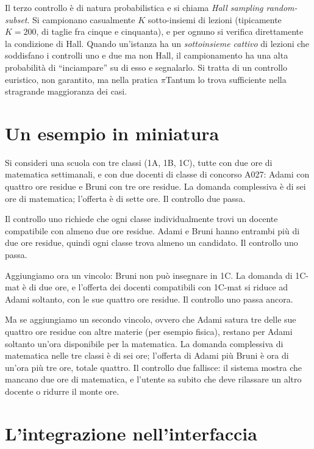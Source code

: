 Il terzo controllo \`e di natura probabilistica e si chiama
\emph{Hall sampling random-subset}. Si campionano
casualmente $K$ sotto-insiemi di lezioni (tipicamente $K =
200$, di taglie fra cinque e cinquanta), e per ognuno si
verifica direttamente la condizione di Hall. Quando
un'istanza ha un \emph{sottoinsieme cattivo} di lezioni che
soddisfano i controlli uno e due ma non Hall, il
campionamento ha una alta probabilit\`a di ``inciampare'' su
di esso e segnalarlo. Si tratta di un controllo euristico,
non garantito, ma nella pratica $\pi$Tantum lo trova
sufficiente nella stragrande maggioranza dei casi.

\section{Un esempio in miniatura}

\begin{esempiobox}
Si consideri una scuola con tre classi (1A, 1B, 1C), tutte
con due ore di matematica settimanali, e con due docenti di
classe di concorso A027: Adami con quattro ore residue e
Bruni con tre ore residue. La domanda complessiva \`e di
sei ore di matematica; l'offerta \`e di sette ore. Il
controllo due passa.

Il controllo uno richiede che ogni classe individualmente
trovi un docente compatibile con almeno due ore residue.
Adami e Bruni hanno entrambi pi\`u di due ore residue, quindi
ogni classe trova almeno un candidato. Il controllo uno
passa.

Aggiungiamo ora un vincolo: Bruni non pu\`o insegnare in 1C.
La domanda di 1C-mat \`e di due ore, e l'offerta dei docenti
compatibili con 1C-mat si riduce ad Adami soltanto, con le
sue quattro ore residue. Il controllo uno passa ancora.

Ma se aggiungiamo un secondo vincolo, ovvero che Adami
satura tre delle sue quattro ore residue con altre materie
(per esempio fisica), restano per Adami soltanto un'ora
disponibile per la matematica. La domanda complessiva di
matematica nelle tre classi \`e di sei ore; l'offerta di
Adami pi\`u Bruni \`e ora di un'ora pi\`u tre ore, totale
quattro. Il controllo due fallisce: il sistema mostra che
mancano due ore di matematica, e l'utente sa subito che
deve rilassare un altro docente o ridurre il monte ore.
\end{esempiobox}

\section{L'integrazione nell'interfaccia}

